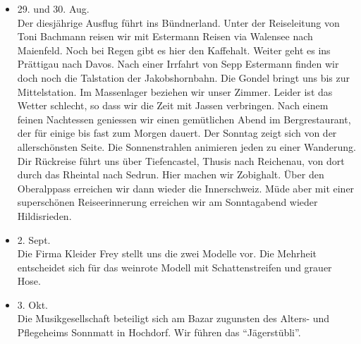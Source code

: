 \begin{history}
\begin{itemize}
        \item[]29. und 30. Aug.\\
        Der diesjährige Ausflug führt ins Bündnerland. Unter der Reiseleitung
        von Toni Bachmann reisen wir mit Estermann Reisen via Walensee nach
        Maienfeld. Noch bei Regen gibt es hier den Kaffehalt. Weiter geht es ins
        Prättigau nach Davos. Nach einer Irrfahrt von Sepp Estermann finden wir
        doch noch die Talstation der Jakobshornbahn. Die Gondel bringt uns bis
        zur Mittelstation. Im Massenlager beziehen wir unser Zimmer. Leider ist
        das Wetter schlecht, so dass wir die Zeit mit Jassen verbringen. Nach
        einem feinen Nachtessen geniessen wir einen gemütlichen Abend im
        Bergrestaurant, der für einige bis fast zum Morgen dauert. Der Sonntag
        zeigt sich von der allerschönsten Seite. Die Sonnenstrahlen animieren
        jeden zu einer Wanderung. Dir Rückreise führt uns über Tiefencastel,
        Thusis nach Reichenau, von dort durch das Rheintal nach Sedrun. Hier
        machen wir Zobighalt. Über den Oberalppass erreichen wir dann wieder die
        Innerschweiz. Müde aber mit einer superschönen Reiseerinnerung erreichen
        wir am Sonntagabend wieder Hildisrieden.

        \item[]2. Sept.\\
        Die Firma Kleider Frey stellt uns die zwei Modelle vor. Die Mehrheit
        entscheidet sich für das weinrote Modell mit Schattenstreifen und grauer
        Hose.

        \item[]3. Okt.\\
        Die Musikgesellschaft beteiligt sich am Bazar zugunsten des Alters- und
        Pflegeheims Sonnmatt in Hochdorf. Wir führen das \enquote{Jägerstübli}.


    \end{itemize}

\end{history}
